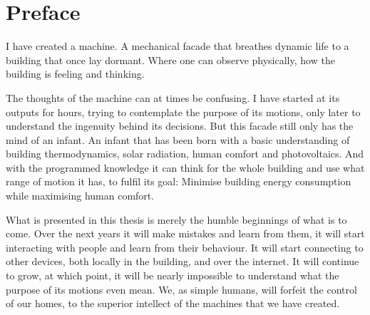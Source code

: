 \begingroup
\let\clearpage\relax
\let\cleardoublepage\relax
\let\cleardoublepage\relax

\chapter*{Preface}

I have created a machine. A mechanical facade that breathes dynamic life to a building that once lay dormant. Where one can observe physically, how the building is feeling and thinking. 

The thoughts of the machine can at times be confusing. I have started at its outputs for hours, trying to contemplate the purpose of its motions, only later to understand the ingenuity behind its decisions. But this facade still only has the mind of an infant. An infant that has been born with a basic understanding of building thermodynamics, solar radiation, human comfort and photovoltaics. And with the programmed knowledge it can think for the whole building and use what range of motion it has, to fulfil its goal: Minimise building energy consumption while maximising human comfort.

What is presented in this thesis is merely the humble beginnings of what is to come. Over the next years it will make mistakes and learn from them, it will start interacting with people and learn from their behaviour. It will start connecting to other devices, both locally in the building, and over the internet. It will continue to grow, at which point, it will be nearly impossible to understand what the purpose of its motions even mean. We, as simple humans, will forfeit the control of our homes, to the superior intellect of the machines that we have created.

\endgroup

\cleardoublepage%
